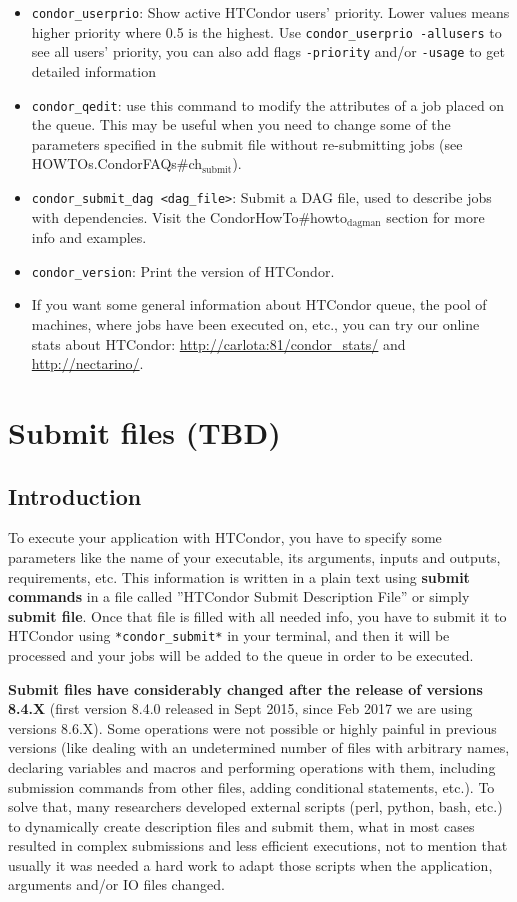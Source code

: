\documentclass[a4paper,10pt]{article}
\begin{document}
\begin{itemize}
\item \texttt{condor\_userprio}: Show active HTCondor users' priority. Lower values means
higher priority where 0.5 is the highest. Use \texttt{condor\_userprio -allusers} to
see all users' priority, you can also add flags \texttt{-priority} and/or \texttt{-usage} to
get detailed information
\item \texttt{condor\_qedit}: use this command to modify the attributes of a job placed on
the queue. This may be useful when you need to change some of the parameters
specified in the submit file without re-submitting jobs (see
HOWTOs.CondorFAQs\#ch\(_{\text{submit}}\)).
\item \texttt{condor\_submit\_dag <dag\_file>}: Submit a DAG file, used to describe jobs
with dependencies. Visit the CondorHowTo\#howto\(_{\text{dagman}}\) section for more info
and examples.
\item \texttt{condor\_version}: Print the version of HTCondor.
\item If you want some general information about HTCondor queue, the pool of
machines, where jobs have been executed on, etc., you can try our online stats
about HTCondor: \url{http://carlota:81/condor\_stats/} and \url{http://nectarino/}.
\end{itemize}


\section{Submit files (TBD)}
\label{sec:orgea0bf7d}

\subsection{Introduction}
\label{sec:org98d137b}

To execute your application with HTCondor, you have to specify some parameters
like the name of your executable, its arguments, inputs and outputs,
requirements, etc. This information is written in a plain text using \textbf{submit
commands} in a file called ''HTCondor Submit Description File'' or simply
\textbf{submit file}. Once that file is filled with all needed info, you have to submit
it to HTCondor using \texttt{*condor\_submit*} in your terminal, and then it will be
processed and your jobs will be added to the queue in order to be executed.

\textbf{Submit files have considerably changed after the release of versions 8.4.X}
(first version 8.4.0 released in Sept 2015, since Feb 2017 we are using versions
8.6.X). Some operations were not possible or highly painful in previous versions
(like dealing with an undetermined number of files with arbitrary names,
declaring variables and macros and performing operations with them, including
submission commands from other files, adding conditional statements, etc.). To
solve that, many researchers developed external scripts (perl, python, bash,
etc.) to dynamically create description files and submit them, what in most
cases resulted in complex submissions and less efficient executions, not to
mention that usually it was needed a hard work to adapt those scripts when the
application, arguments and/or IO files changed.
\end{document}
